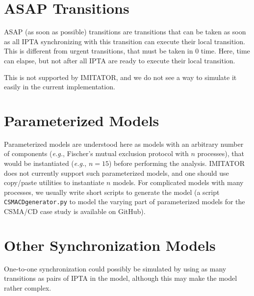 \documentclass[a4paper,11pt]{report}
\newcommand{\imitator}{\textsf{IMITATOR}}
\newcommand{\IPTA}{IPTA}
\newcommand{\stylePath}[1]{\textcolor{pathcolor}{\texttt{#1}}}
\newcommand{\GitHubIMI}{GitHub} %
\newcommand{\eg}{\textcolor{colorok}{\textit{e.g.}, }}
\begin{document}



\section{ASAP Transitions}

ASAP (as soon as possible) transitions are transitions that can be taken as soon as all \IPTA{} synchronizing with this transition can execute their local transition.
This is different from urgent transitions, that must be taken in 0 time.
Here, time can elapse, but not after all \IPTA{} are ready to execute their local transition.

This is not supported by \imitator{}, and we do not see a way to simulate it easily in the current implementation.



\section{Parameterized Models}

Parameterized models are understood here as models with an arbitrary number of components (\eg{} Fischer's mutual exclusion protocol with $n$ processes), that would be instantiated (\eg{} $n = 15$) before performing the analysis.
\imitator{} does not currently support such parameterized models, and one should use copy/paste utilities to instantiate $n$ models.
For complicated models with many processes, we usually write short scripts to generate the model (a script \stylePath{CSMACDgenerator.py} to model the varying part of parameterized models for the CSMA/CD case study is available on \GitHubIMI{}).




\section{Other Synchronization Models}

One-to-one synchronization could possibly be simulated by using as many transitions as pairs of \IPTA{} in the model, although this may make the model rather complex.
\end{document}
